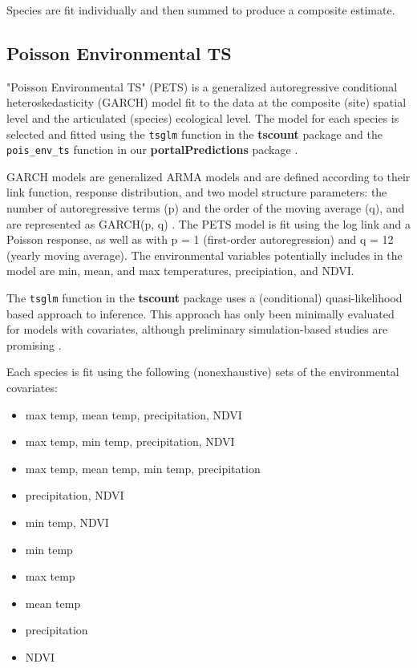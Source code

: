 \documentclass{article}
\def\code#1{\texttt{#1}}
\begin{document}
Species are fit individually and then summed to produce a composite estimate. 

\subsection{Poisson Environmental TS}
\label{subsec:currmods_pevts}

"Poisson Environmental TS" (PETS) is a generalized autoregressive conditional heteroskedasticity (GARCH) model fit to the data at the composite (site) spatial level and the articulated (species) ecological level. The model for each species is selected and fitted using the \code{tsglm} function in the \textbf{tscount} package \citep{Liboschik2017a} and the \code{pois\_env\_ts} function in our \textbf{portalPredictions} package \citep{PortalPredictions}.

GARCH models are generalized ARMA models and are defined according to their link function, response distribution, and two model structure parameters: the number of autoregressive terms (p) and the order of the moving average (q), and are represented as GARCH(p, q) \citep{Liboschik2017a}. The PETS model is fit using the log link and a Poisson response, as well as with p = 1 (first-order autoregression) and q = 12 (yearly moving average). The environmental variables potentially includes in the model are min, mean, and max temperatures, precipiation, and NDVI. 

The \code{tsglm} function in the \textbf{tscount} package \citep{Liboschik2017a} uses a (conditional) quasi-likelihood based approach to inference. This approach has only been minimally evaluated for models with covariates, although preliminary simulation-based studies are promising \citep{Liboschik2017b}.  

Each species is fit using the following (nonexhaustive) sets of the environmental covariates:
\begin{itemize}
\item max temp, mean temp, precipitation, NDVI
\item max temp, min temp, precipitation, NDVI
\item max temp, mean temp, min temp, precipitation
\item precipitation, NDVI
\item min temp, NDVI
\item min temp
\item max temp
\item mean temp
\item precipitation 
\item NDVI
\end{itemize}
\end{document}
